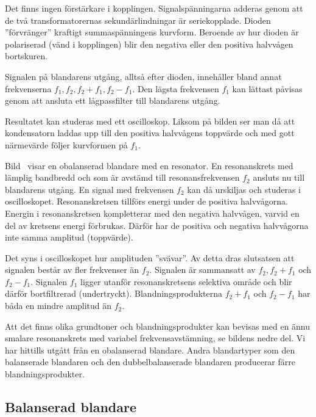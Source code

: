 Det finns ingen förstärkare i kopplingen.
Signalspänningarna adderas genom att de två transformatorernas
sekundärlindningar är seriekopplade.
Dioden ''förvränger'' kraftigt summaspänningens kurvform.
Beroende av hur dioden är polariserad (vänd i kopplingen) blir den negativa
eller den positiva halvvågen bortskuren.

Signalen på blandarens utgång, alltså efter dioden, innehåller
bland annat frekvenserna \(f_1, f_2, f_2+f_1, f_2-f_1\).
Den lägsta frekvensen \(f_1\) kan lättast påvisas genom att ansluta ett
lågpassfilter till blandarens utgång.

Resultatet kan studeras med ett oscilloskop.
Liksom på bilden ser man då att kondensatorn laddas upp till den positiva
halvvågens toppvärde och med gott närmevärde följer kurvformen på \(f_1\).


Bild~ visar en obalanserad blandare med en resonator.
En resonanskrets med lämplig bandbredd och som är avstämd till
resonansfrekvensen \(f_2\) ansluts nu till blandarens utgång.
En signal med frekvensen \(f_2\) kan då urskiljas och studeras i oscilloskopet.
Resonanskretsen tillförs energi under de positiva halvvågorna.
Energin i resonanskretsen kompletterar med den negativa halvvågen, varvid en
del av kretsens energi förbrukas.
Därför har de positiva och negativa halvvågorna inte samma amplitud (toppvärde).

Det syns i oscilloskopet hur amplituden ''svävar''.
Av detta dras slutsatsen att signalen består av fler frekvenser än \(f_2\).
Signalen är sammansatt av \(f_2, f_2+f_1\) och \(f_2-f_1\).
Signalen \(f_1\) ligger utanför resonanskretsens selektiva område och blir
därför bortfiltrerad (undertryckt).
Blandningsprodukterna \(f_2 + f_1\) och \(f_2 - f_1\) har båda en mindre
amplitud än \(f_2\).

Att det finns olika grundtoner och blandningsprodukter kan bevisas med en ännu
smalare resonanskrets med variabel frekvensavstämning, se bildens nedre del.
Vi har hittills utgått från en obalanserad blandare.
Andra blandartyper som den balanserade blandaren och den dubbelbalanserade
blandaren producerar färre blandningsprodukter.

\subsection{Balanserad blandare}

